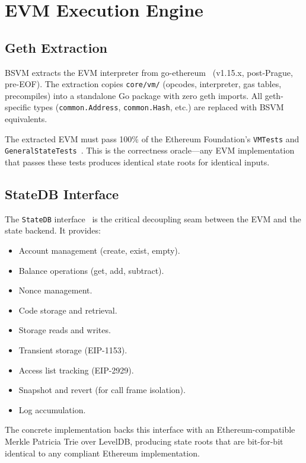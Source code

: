 \documentclass[11pt,twocolumn]{article}
\begin{document}
\section{EVM Execution Engine}
\label{sec:evm}

\subsection{Geth Extraction}

BSVM extracts the EVM interpreter from go-ethereum~\cite{geth} (v1.15.x, post-Prague, pre-EOF). The extraction copies \texttt{core/vm/} (opcodes, interpreter, gas tables, precompiles) into a standalone Go package with zero geth imports. All geth-specific types (\texttt{common.Address}, \texttt{common.Hash}, etc.) are replaced with BSVM equivalents.

The extracted EVM must pass 100\% of the Ethereum Foundation's \texttt{VMTests} and \texttt{GeneralStateTests}~\cite{ethereum_tests}. This is the correctness oracle---any EVM implementation that passes these tests produces identical state roots for identical inputs.

\subsection{StateDB Interface}

The \texttt{StateDB} interface~\cite{wood_ethereum} is the critical decoupling seam between the EVM and the state backend. It provides:

\begin{itemize}[nosep,leftmargin=1.5em]
\item Account management (create, exist, empty).
\item Balance operations (get, add, subtract).
\item Nonce management.
\item Code storage and retrieval.
\item Storage reads and writes.
\item Transient storage (EIP-1153).
\item Access list tracking (EIP-2929).
\item Snapshot and revert (for call frame isolation).
\item Log accumulation.
\end{itemize}

The concrete implementation backs this interface with an Ethereum-compatible Merkle Patricia Trie over LevelDB, producing state roots that are bit-for-bit identical to any compliant Ethereum implementation.
\end{document}
